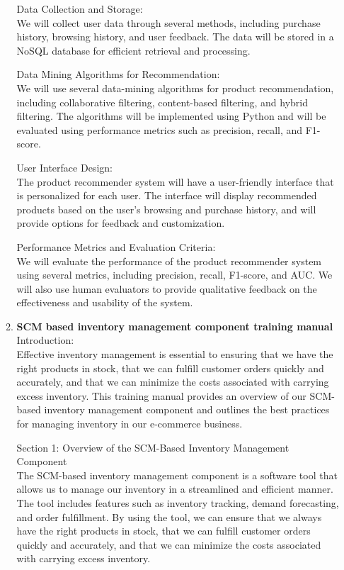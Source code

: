 \documentclass[12pt]{article}
\begin{document}
\begin{enumerate}
\begin{enumerate}
Data Collection and Storage:\\
We will collect user data through several methods, including purchase history, browsing history, and user feedback. The data will be stored in a NoSQL database for efficient retrieval and processing.

Data Mining Algorithms for Recommendation:\\
We will use several data-mining algorithms for product recommendation, including collaborative filtering, content-based filtering, and hybrid filtering. The algorithms will be implemented using Python and will be evaluated using performance metrics such as precision, recall, and F1-score.

User Interface Design:\\
The product recommender system will have a user-friendly interface that is personalized for each user. The interface will display recommended products based on the user's browsing and purchase history, and will provide options for feedback and customization.

Performance Metrics and Evaluation Criteria:\\
We will evaluate the performance of the product recommender system using several metrics, including precision, recall, F1-score, and AUC. We will also use human evaluators to provide qualitative feedback on the effectiveness and usability of the system.
    
\item {\bfseries SCM based inventory management component training manual\\}
Introduction:\\
 Effective inventory management is essential to ensuring that we have the right products in stock, that we can fulfill customer orders quickly and accurately, and that we can minimize the costs associated with carrying excess inventory. This training manual provides an overview of our SCM-based inventory management component and outlines the best practices for managing inventory in our e-commerce business.

Section 1: Overview of the SCM-Based Inventory Management Component\\
The SCM-based inventory management component is a software tool that allows us to manage our inventory in a streamlined and efficient manner. The tool includes features such as inventory tracking, demand forecasting, and order fulfillment. By using the tool, we can ensure that we always have the right products in stock, that we can fulfill customer orders quickly and accurately, and that we can minimize the costs associated with carrying excess inventory.


\end{enumerate}
\end{enumerate}
\end{document}
